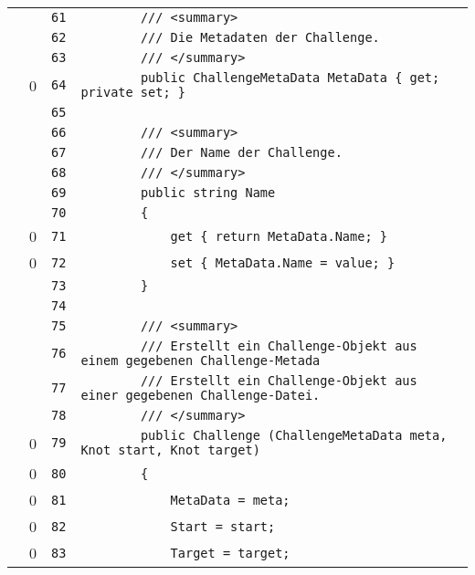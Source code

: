 \documentclass[a4paper,10pt]{article}
\begin{document}
\begin{longtable}[l]{lrrl}
\cellcolor{gray} &  & \verb~61~ & \verb~        /// <summary>~\\
\cellcolor{gray} &  & \verb~62~ & \verb~        /// Die Metadaten der Challenge.~\\
\cellcolor{gray} &  & \verb~63~ & \verb~        /// </summary>~\\
\cellcolor{red} & 0 & \verb~64~ & \verb~        public ChallengeMetaData MetaData { get; private set; }~\\
\cellcolor{gray} &  & \verb~65~ & \verb~~\\
\cellcolor{gray} &  & \verb~66~ & \verb~        /// <summary>~\\
\cellcolor{gray} &  & \verb~67~ & \verb~        /// Der Name der Challenge.~\\
\cellcolor{gray} &  & \verb~68~ & \verb~        /// </summary>~\\
\cellcolor{gray} &  & \verb~69~ & \verb~        public string Name~\\
\cellcolor{gray} &  & \verb~70~ & \verb~        {~\\
\cellcolor{red} & 0 & \verb~71~ & \verb~            get { return MetaData.Name; }~\\
\cellcolor{red} & 0 & \verb~72~ & \verb~            set { MetaData.Name = value; }~\\
\cellcolor{gray} &  & \verb~73~ & \verb~        }~\\
\cellcolor{gray} &  & \verb~74~ & \verb~~\\
\cellcolor{gray} &  & \verb~75~ & \verb~        /// <summary>~\\
\cellcolor{gray} &  & \verb~76~ & \verb~        /// Erstellt ein Challenge-Objekt aus einem gegebenen Challenge-Metada~\\
\cellcolor{gray} &  & \verb~77~ & \verb~        /// Erstellt ein Challenge-Objekt aus einer gegebenen Challenge-Datei.~\\
\cellcolor{gray} &  & \verb~78~ & \verb~        /// </summary>~\\
\cellcolor{red} & 0 & \verb~79~ & \verb~        public Challenge (ChallengeMetaData meta, Knot start, Knot target)~\\
\cellcolor{red} & 0 & \verb~80~ & \verb~        {~\\
\cellcolor{red} & 0 & \verb~81~ & \verb~            MetaData = meta;~\\
\cellcolor{red} & 0 & \verb~82~ & \verb~            Start = start;~\\
\cellcolor{red} & 0 & \verb~83~ & \verb~            Target = target;~\\

\end{longtable}
\end{document}
